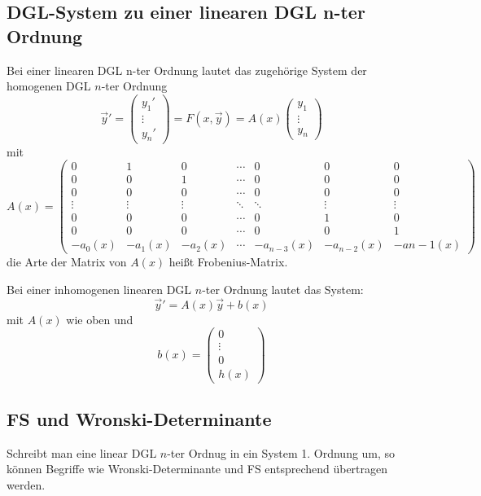 \subsection{DGL-System zu einer linearen DGL n-ter Ordnung}
Bei einer linearen DGL n-ter Ordnung lautet das zugehörige System der homogenen DGL $n$-ter Ordnung
\begin{equation*}
	\vec{y}' = \begin{pmatrix}
		y_1' \\ \vdots \\ y_n'
	\end{pmatrix}
	= F(x,\vec{y}) = A(x) \begin{pmatrix}
		y_1 \\ \vdots \\ y_n
	\end{pmatrix}
\end{equation*}
mit
\begin{equation*}
	A(x) = \begin{pmatrix}
		0 & 1 & 0 & \cdots & 0 & 0 & 0 \\
		0 & 0 & 1 & \cdots & 0 & 0 & 0 \\
		0 & 0 & 0 & \cdots & 0 & 0 & 0 \\
		\vdots & \vdots & \vdots & \ddots & \ddots & \vdots & \vdots \\
		0 & 0 & 0 & \cdots & 0 & 1 & 0 \\
		0 & 0 & 0 & \cdots & 0 & 0 & 1 \\
		-a_0(x) & -a_1(x) & -a_2(x) & \cdots & -a_{n-3}(x) & -a_{n-2}(x) & -a{n-1}(x)
	\end{pmatrix}
\end{equation*}
die Arte der Matrix von $A(x)$ heißt Frobenius-Matrix.

Bei einer inhomogenen linearen DGL $n$-ter Ordnung lautet das System:
\begin{equation*}
	\vec{y}' = A(x) \vec{y} + b(x)
\end{equation*}
mit $A(x)$ wie oben und
\begin{equation*}
	b(x) = \begin{pmatrix}
		0 \\ \vdots \\ 0 \\ h(x)
	\end{pmatrix}
\end{equation*}

\subsection{FS und Wronski-Determinante}
Schreibt man eine linear DGL $n$-ter Ordnug in ein System 1. Ordnung um, so können Begriffe wie Wronski-Determinante und FS entsprechend
übertragen werden.

